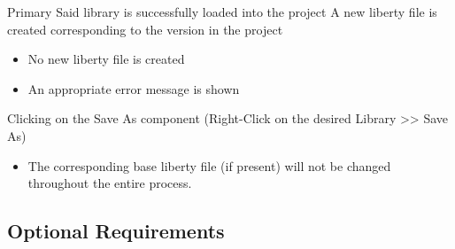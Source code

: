 \documentclass[10pt,a4paper]{report}
\begin{document}
\begin{FR}
    {Primary}
    {Said library is successfully loaded into the project}
    {A new liberty file is created corresponding to the version in the project}
    {\begin{itemize}
        \item No new liberty file is created
        \item An appropriate error message is shown
    \end{itemize}}
    {Clicking on the Save As component (Right-Click on the desired Library  >> Save As)}
    {\begin{itemize}
        \item The corresponding base liberty file (if present) will not be changed throughout the entire process.
    \end{itemize}}
\end{FR}

\subsection{Optional Requirements}
\end{document}
